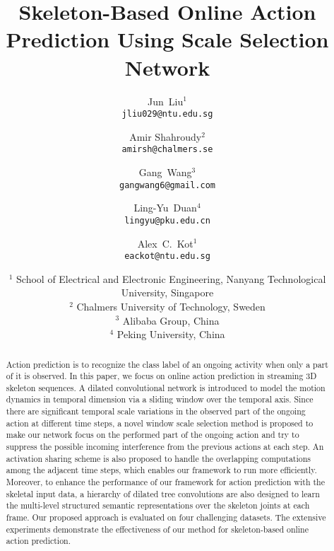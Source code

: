 \documentclass[10pt,twocolumn,letterpaper]{article}
\begin{document}
\title{Skeleton-Based Online Action Prediction Using Scale Selection Network}

\author{Jun~Liu$^{1}$\\{\tt\small jliu029@ntu.edu.sg}
  \and Amir Shahroudy$^{2}$\\{\tt\small amirsh@chalmers.se}
  \and Gang~Wang$^{3}$\\{\tt\small gangwang6@gmail.com}
	\and Ling-Yu~Duan$^{4}$\\{\tt\small lingyu@pku.edu.cn}
  \and Alex~C.~Kot$^{1}$\\{\tt\small eackot@ntu.edu.sg}
	\and $^1$ School of Electrical and Electronic Engineering, Nanyang Technological University, Singapore
   \\$^2$ Chalmers University of Technology, Sweden
   \\$^3$ Alibaba Group, China \hspace{20pt} 
   \\$^4$ Peking University, China
}


\maketitle


\begin{abstract}
   Action prediction is to recognize the class label of an ongoing activity when only a part of it is observed.
   In this paper, we focus on online action prediction in streaming 3D skeleton sequences.
   A dilated convolutional network is introduced to model the motion dynamics in temporal dimension via a sliding window over the temporal axis.
   Since there are significant temporal scale variations in the observed part of the ongoing action at different time steps,
   a novel window scale selection method is proposed to make our network focus on the performed part of the ongoing action and try to suppress the possible incoming interference from the previous actions
   at each step.
An activation sharing scheme is also proposed to handle the overlapping computations among the adjacent time steps,
   which enables our framework to run more efficiently.
Moreover, to enhance the performance of our framework for action prediction with the skeletal input data,
   a hierarchy of dilated tree convolutions are also designed to learn the multi-level structured semantic representations over the skeleton joints at each frame.
   Our proposed approach is evaluated on four challenging datasets.
   The extensive experiments demonstrate the effectiveness of our method for skeleton-based online action prediction.  
\end{abstract}
\end{document}
